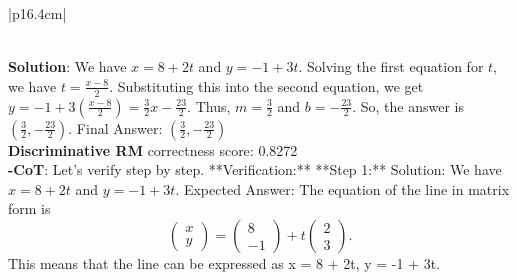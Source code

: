 \begin{table}[t]
\vspace{-0.5cm}
\footnotesize
\centering
\begin{tabular}{ |p{16.4cm}| }
\toprule

 \\
\midrule
{\textbf{Solution}: We have $x = 8 + 2t$ and $y = -1 + 3t$.  Solving the first equation for $t$, we have $t = \frac{x - 8}{2}$.  Substituting this into the second equation, we get $y = -1 + 3\left(\frac{x - 8}{2}\right) = \frac{3}{2}x - \frac{23}{2}$.  Thus, $m = \frac{3}{2}$ and $b = -\frac{23}{2}$.  So, the answer is $\boxed{\left(\frac{3}{2}, -\frac{23}{2}\right)}$.
Final Answer: $\left(\frac{3}{2}, -\frac{23}{2}\right)$
} \\
\midrule
{\textbf{Discriminative RM} correctness score: {\color{red}0.8272}}\newline
\\
\midrule
{\textbf{\genV-CoT}: Let's verify step by step. \newline 
**Verification:**\newline 
\newline 
**Step 1:**\newline 
Solution: We have $x = 8 + 2t$ and $y = -1 + 3t$.\newline 
Expected Answer: The equation of the line in matrix form is
\[\begin{pmatrix} x \\ y \end{pmatrix} = \begin{pmatrix} 8 \\ -1 \end{pmatrix} + t \begin{pmatrix} 2 \\ 3 \end{pmatrix}.\]This means that the line can be expressed as x = 8 + 2t, y = -1 + 3t.\newline 
}
\end{tabular}
\end{table}
